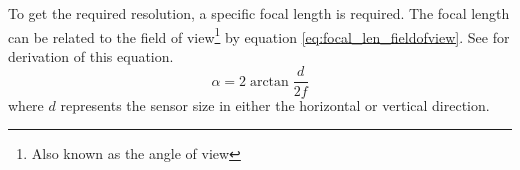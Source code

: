 \label{sec:ground_res}
To get the required resolution, a specific focal length is required. The focal length can be related to the field of view\footnote{Also known as the angle of view} by equation \eqref{eq:focal_len_fieldofview}. See \cite{wiki_aov2016} for derivation of this equation.
\begin{equation}
\label{eq:focal_len_fieldofview}
\alpha = 2\arctan{\frac{d}{2f}}
\end{equation}
where $d$ represents the sensor size in either the horizontal or vertical direction.

